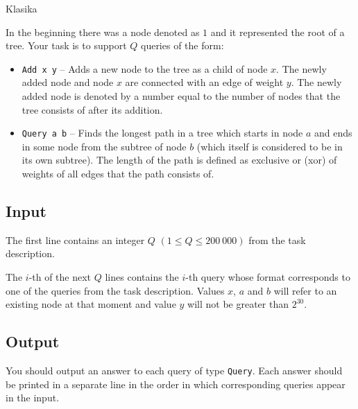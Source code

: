 \begin{statement}[
  problempoints=110,
  timelimit=5 seconds,
  memorylimit=512 MiB,
]{Klasika}


In the beginning there was a node denoted as $1$ and it represented the root
of a tree. Your task is to support $Q$ queries of the form:

\begin{itemize}
  \item \texttt{Add x y} -- Adds a new node to the tree as a child of node $x$.
        The newly added node and node $x$ are connected with an edge of weight
        $y$. The newly added node is denoted by a number equal to the number
        of nodes that the tree consists of after its addition.
  \item \texttt{Query a b} -- Finds the longest path in a tree which starts in
        node $a$ and ends in some node from the subtree of node $b$ (which itself
        is considered to be in its own subtree). The length of the path is defined
        as exclusive or (xor) of weights of all edges that the path consists of.
\end{itemize}

\subsection*{Input}
The first line contains an integer $Q$ $(1 \le Q \le 200\ 000)$ from the task
description.

The $i$-th of the next $Q$ lines contains the $i$-th query whose format
corresponds to one of the queries from the task description. Values $x$, $a$ and
$b$ will refer to an existing node at that moment and value $y$ will not be
greater than $2^{30}$.

\subsection*{Output}
You should output an answer to each query of type \texttt{Query}. Each
answer should be printed in a separate line in the order in which
corresponding queries appear in the input.


\end{statement}
